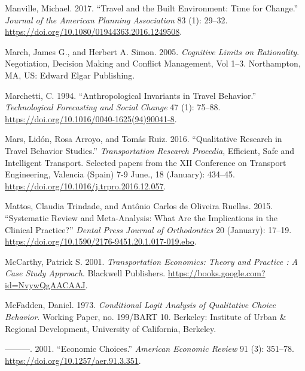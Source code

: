 \documentclass[
  11pt,
  openany]{memoir}
\newlength{\cslhangindent}
\newlength{\cslentryspacingunit} %
\newenvironment{CSLReferences}[2] %
 {%
  \setlength{\parindent}{0pt}
  \ifodd #1
  \let\oldpar\par
  \def\par{\hangindent=\cslhangindent\oldpar}
  \fi
  \setlength{\parskip}{#2\cslentryspacingunit}
 }%
 {}
\begin{document}
\begin{CSLReferences}{1}{0}
\leavevmode{}%
Manville, Michael. 2017. {``Travel and the {Built Environment}: Time for {Change}.''} \emph{Journal of the American Planning Association} 83 (1): 29--32. \url{https://doi.org/10.1080/01944363.2016.1249508}.

\leavevmode{}%
March, James G., and Herbert A. Simon. 2005. \emph{Cognitive {Limits} on {Rationality}}. Negotiation, Decision Making and Conflict Management, {Vol} 1--3. {Northampton, MA, US}: {Edward Elgar Publishing}.

\leavevmode{}%
Marchetti, C. 1994. {``Anthropological Invariants in Travel Behavior.''} \emph{Technological Forecasting and Social Change} 47 (1): 75--88. \url{https://doi.org/10.1016/0040-1625(94)90041-8}.

\leavevmode{}%
Mars, Lidón, Rosa Arroyo, and Tomás Ruiz. 2016. {``Qualitative {Research} in {Travel Behavior Studies}.''} \emph{Transportation Research Procedia}, Efficient, {Safe} and {Intelligent Transport}. {Selected} papers from the {XII Conference} on {Transport Engineering}, {Valencia} ({Spain}) 7-9 {June}., 18 (January): 434--45. \url{https://doi.org/10.1016/j.trpro.2016.12.057}.

\leavevmode{}%
Mattos, Claudia Trindade, and Antônio Carlos de Oliveira Ruellas. 2015. {``Systematic Review and Meta-Analysis: What Are the Implications in the Clinical Practice?''} \emph{Dental Press Journal of Orthodontics} 20 (January): 17--19. \url{https://doi.org/10.1590/2176-9451.20.1.017-019.ebo}.

\leavevmode{}%
McCarthy, Patrick S. 2001. \emph{Transportation {Economics}: Theory and {Practice} : A {Case Study Approach}}. {Blackwell Publishers}. \url{https://books.google.com?id=NvywQgAACAAJ}.

\leavevmode{}%
McFadden, Daniel. 1973. \emph{Conditional Logit Analysis of Qualitative Choice Behavior}. Working Paper, no. 199/BART 10. {Berkeley}: {Institute of Urban \& Regional Development, University of California, Berkeley}.

\leavevmode{}%
---------. 2001. {``Economic {Choices}.''} \emph{American Economic Review} 91 (3): 351--78. \url{https://doi.org/10.1257/aer.91.3.351}.


\end{CSLReferences}
\end{document}
